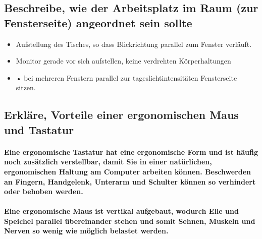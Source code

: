 \documentclass[a4paper]{article}
\begin{document}
    \subsection{\color{red}Beschreibe, wie der Arbeitsplatz im Raum (zur Fensterseite) angeordnet sein sollte}\label{subsec:color{red}beschreibe-wie-der-arbeitsplatz-im-raum-(zur-fensterseite)-angeordnet-sein-sollte}
    \begin{itemize}
        \color{magenta}
        \item Aufstellung des Tisches, so dass
        Blickrichtung parallel zum Fenster
        verläuft.
        \item Monitor gerade vor sich aufstellen,
        keine verdrehten Körperhaltungen
        \item • bei mehreren Fenstern parallel
        zur tageslichtintensitäten Fensterseite
        sitzen.
    \end{itemize}

    \subsection{\color{red}Erkläre, Vorteile einer ergonomischen Maus und Tastatur}\label{subsec:color{red}erkläre-vorteile-einer-ergonomischen-maus-und-tastatur}

    \paragraph{\color{codegreen} Eine \color{red} ergonomische Tastatur \color{codegreen} hat eine ergonomische Form und ist häufig noch zusätzlich verstellbar, damit Sie in einer natürlichen, ergonomischen Haltung am Computer arbeiten können. Beschwerden an Fingern, Handgelenk, Unterarm und Schulter können so verhindert oder behoben werden.}

    \paragraph{\color{codegreen} Eine \color{red}ergonomische Maus \color{codegreen} ist vertikal aufgebaut, wodurch Elle und Speichel parallel übereinander stehen und somit Sehnen, Muskeln und Nerven so wenig wie möglich belastet werden.}
\end{document}
